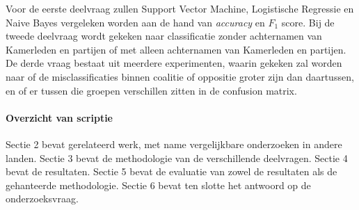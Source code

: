 Voor de eerste deelvraag zullen Support Vector Machine, Logistische Regressie en Naive Bayes vergeleken worden aan de hand van \textit{accuracy} en $F_1$ score. Bij de tweede deelvraag wordt gekeken naar classificatie zonder achternamen van Kamerleden en partijen of met alleen achternamen van Kamerleden en partijen. De derde vraag bestaat uit meerdere experimenten, waarin gekeken zal worden naar of de misclassificaties binnen coalitie of oppositie groter zijn dan daartussen, en of er tussen die groepen verschillen zitten in de confusion matrix. 


\paragraph{Overzicht van scriptie}
Sectie 2 bevat gerelateerd werk, met name vergelijkbare onderzoeken in andere landen. Sectie 3 bevat de methodologie van de verschillende deelvragen. Sectie 4 bevat de resultaten. Sectie 5 bevat de evaluatie van zowel de resultaten als de gehanteerde methodologie. Sectie 6 bevat ten slotte het antwoord op de onderzoeksvraag.
